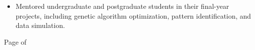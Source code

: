 \documentclass[oneside]{article}
\begin{document}
{\begin{minipage}[t][\dimexpr\textheight-2\fboxrule-2\fboxsep\relax][t]{\dimexpr0.6\textwidth-2\fboxrule-2\fboxsep\relax}
{\begin{itemize}
            \item Mentored undergraduate and postgraduate students in their final-year projects, including genetic algorithm optimization, pattern identification, and data simulation.

            
        \end{itemize}
        }
        \vfill%
        {\hfill\small{}\selectfont Page \thepage of \pageref{LastPage}\hfill}
    \end{minipage}
}

\newpage
\end{document}
